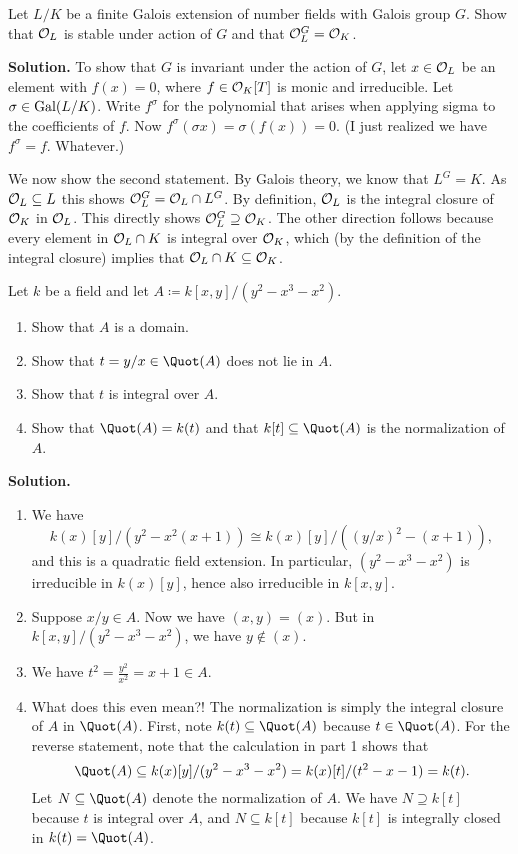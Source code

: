 \documentclass[a4paper,11pt]{article}
\begin{document}
Let $L/K$ be a finite Galois extension of number fields with Galois group $G$. 
Show that $\mathcal{O}_L$ is stable under action of $G$ and that $\mathcal{O}_L^G = \mathcal{O}_K$. 

\textbf{Solution.} To show that $G$ is invariant under the action of $G$, let
$x \in \mathcal{O}_L$ be an element with $f(x) = 0$, where $f \in \mathcal{O}_K[T]$ is 
monic and irreducible. Let $\sigma \in \operatorname{Gal}(L/K)$. Write $f^\sigma$ for the 
polynomial that arises when applying sigma to the coefficients of 
$f$. Now $f^\sigma (\sigma x) = \sigma(f(x)) = 0.$ (I just realized we have
$f^\sigma = f$. Whatever.)

We now show the second statement. By Galois theory, we know that 
$L^G = K$. As $\mathcal{O}_L \subseteq L$ this shows 
$\mathcal{O}_L^G = \mathcal{O}_L \cap L^G$. By definition, $\mathcal{O}_L$ is the integral closure of
$\mathcal{O}_K$ in $\mathcal{O}_L$. This directly shows $\mathcal{O}_L^G \supseteq \mathcal{O}_K$. The other 
direction follows because every element in $\mathcal{O}_L \cap K$ is integral over 
$\mathcal{O}_K$, which (by the definition of the integral closure) implies that
$\mathcal{O}_L \cap K \subseteq \mathcal{O}_K$. 

Let $k$ be a field and let $A \coloneqq k[x,y]/(y^2-x^3-x^2)$. 
\begin{enumerate}
    \item Show that $A$ is a domain.
    \item Show that $t = y/x \in \Quot(A)$ does not lie in $A$.
    \item Show that $t$ is integral over $A$.
    \item Show that $\Quot(A) = k(t)$ and that $k[t] \subseteq \Quot(A)$ is 
        the normalization of $A$. 
\end{enumerate}
\textbf{Solution.}
\begin{enumerate}
    \item We have 
        $$k(x)[y]/(y^2 - x^2(x+1)) \cong k(x)[y]/((y/x)^2 - (x+1)),$$
        and this is a quadratic field extension. In particular, $(y^2 - x^3 - x^2)$
        is irreducible in $k(x)[y]$, hence also irreducible in $k[x,y]$. 
    \item Suppose $x/y \in A$. Now we have $(x,y) = (x)$. But in $k[x,y]/(y^2 -
        x^3 -x^2)$, we have $y \not \in (x)$.  
    \item We have $t^2 = \frac{y^2}{x^2} = x + 1 \in A$.
    \item What does this even mean?! The normalization is simply the integral closure
        of $A$ in $\Quot(A)$. First, note $k(t) \subseteq \Quot(A)$ because 
        $t \in \Quot(A)$. For the reverse statement, note that the calculation 
        in part 1 shows that 
        $$\Quot(A) \subseteq k(x)[y]/(y^2 - x^3- x^2) = k(x)[t]/(t^2 - x -1)=k(t).$$
        Let $N \subseteq \Quot(A)$ denote the normalization of $A$. We have 
        $N \supseteq k[t]$ because $t$ is integral over $A$, and $N \subseteq k[t]$
        because $k[t]$ is integrally closed in $k(t) = \Quot(A)$. 
\end{enumerate}

\contactend
\end{document}
